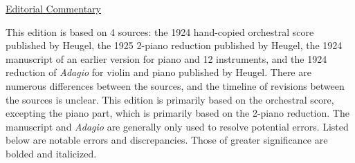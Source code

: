 \documentclass[twoside]{article}
\begin{document}
\begin{center}
\underline{\huge{Editorial Commentary}}
\end{center}

This edition is based on 4 sources: the 1924 hand-copied orchestral score published by Heugel, the 1925 2-piano reduction published by Heugel, the 1924 manuscript of an earlier version for piano and 12 instruments, and the 1924 reduction of \textit{Adagio} for violin and piano published by Heugel. There are numerous differences between the sources, and the timeline of revisions between the sources is unclear. This edition is primarily based on the orchestral score, excepting the piano part, which is primarily based on the 2-piano reduction. The manuscript and \textit{Adagio} are generally only used to resolve potential errors. Listed below are notable errors and discrepancies. Those of greater significance are bolded and italicized.
\end{document}
